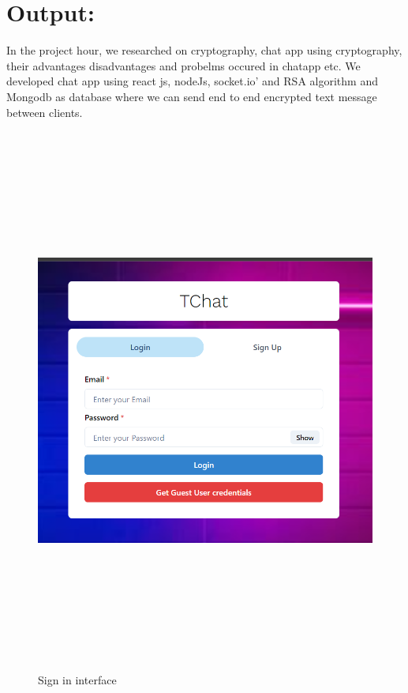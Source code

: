\section{ Output:}
In the project hour, we researched on cryptography, chat app using cryptography, their advantages
disadvantages and probelms occured in chatapp etc. We developed chat app using react js, nodeJs, socket.io’
and RSA algorithm and Mongodb as database where we can send end to end encrypted text message between clients.



\begin{figure}[H]
	\centering
	\includegraphics[width=160mm, height=180mm]{images/signin.png}
	\caption{Sign in interface} %
	\label{figusecase} %
\end{figure}
